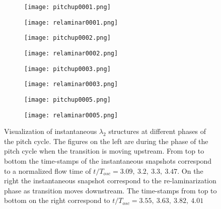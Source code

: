 \begin{figure}
	\centering
	\begin{subfigure}[t]{0.48\textwidth}
		\centering
		\texttt{[image: pitchup0001.png]}
		\label{fig:pitchup_1}
	\end{subfigure}
	\begin{subfigure}[t]{0.48\textwidth}
		\centering
		\texttt{[image: relaminar0001.png]}
		\label{fig:relaminar_1}
	\end{subfigure}
	\begin{subfigure}[t]{0.49\textwidth}
		\centering
		\texttt{[image: pitchup0002.png]}
		\label{fig:pitchup_2}
	\end{subfigure}
	\begin{subfigure}[t]{0.49\textwidth}
		\centering
		\texttt{[image: relaminar0002.png]}
		\label{fig:relaminar_2}
	\end{subfigure}
	\begin{subfigure}[t]{0.49\textwidth}
		\centering
		\texttt{[image: pitchup0003.png]}
		\label{fig:pitchup_3}
	\end{subfigure}
	\begin{subfigure}[t]{0.49\textwidth}
		\centering
		\texttt{[image: relaminar0003.png]}
		\label{fig:relaminar_3}
	\end{subfigure}
	\begin{subfigure}[t]{0.49\textwidth}
		\centering
		\texttt{[image: pitchup0005.png]}
		\label{fig:pitchup_4}
	\end{subfigure}
	\begin{subfigure}[t]{0.49\textwidth}
		\centering
		\texttt{[image: relaminar0005.png]}
		\label{fig:relaminar_4}
	\end{subfigure}	
	\caption{Visualization of instantaneous $\lambda_{2}$ structures at different phases of the pitch cycle. The figures on the left are during the phase of the pitch cycle when the transition is moving upstream. From top to bottom the time-stamps of the instantaneous snapshots correspond to a normalized flow time of $t/T_{osc}=3.09,\ 3.2,\ 3.3,\ 3.47$. On the right the instantaneous snapshot correspond to the re-laminarization phase as transition moves downstream. The time-stamps from top to bottom on the right correspond to $t/T_{osc}=3.55,\ 3.63,\ 3.82,\ 4.01$}
	\label{fig:transition_la2}
\end{figure}


